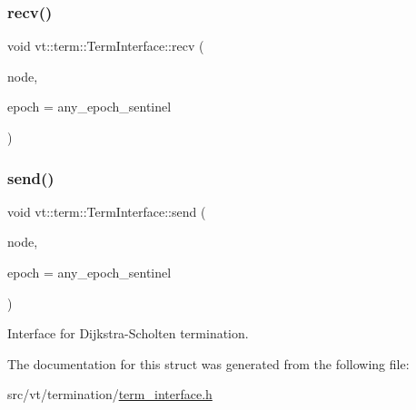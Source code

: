 \mbox{\label{structvt_1_1term_1_1_term_interface_afffcd1367305830597216a7b48886cb1}} 
\subsubsection{\texorpdfstring{recv()}{recv()}}
{\footnotesize\ttfamily void vt\+::term\+::\+Term\+Interface\+::recv (\begin{DoxyParamCaption}\item[{\hyperlink{namespacevt_a866da9d0efc19c0a1ce79e9e492f47e2}{Node\+Type} const \&}]{node,  }\item[{\hyperlink{namespacevt_a985a5adf291c34a3ca263b3378388236}{Epoch\+Type} const \&}]{epoch = {\ttfamily any\+\_\+epoch\+\_\+sentinel} }\end{DoxyParamCaption})}

\mbox{\label{structvt_1_1term_1_1_term_interface_a21ef75badf08fea19807204e502ec4fe}} 
\subsubsection{\texorpdfstring{send()}{send()}}
{\footnotesize\ttfamily void vt\+::term\+::\+Term\+Interface\+::send (\begin{DoxyParamCaption}\item[{\hyperlink{namespacevt_a866da9d0efc19c0a1ce79e9e492f47e2}{Node\+Type} const \&}]{node,  }\item[{\hyperlink{namespacevt_a985a5adf291c34a3ca263b3378388236}{Epoch\+Type} const \&}]{epoch = {\ttfamily any\+\_\+epoch\+\_\+sentinel} }\end{DoxyParamCaption})}



Interface for Dijkstra-\/\+Scholten termination. 



The documentation for this struct was generated from the following file\+:\begin{DoxyCompactItemize}
\item 
src/vt/termination/\hyperlink{term__interface_8h}{term\+\_\+interface.\+h}\end{DoxyCompactItemize}
